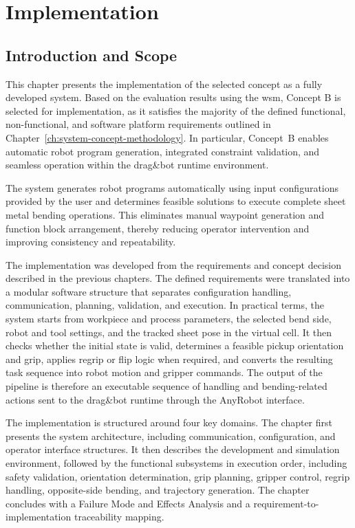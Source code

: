 \chapter{Implementation}
\label{ch:implementation}

\section{Introduction and Scope}
\label{sec:implementation-introduction-scope}

This chapter presents the implementation of the selected concept as a fully developed system. Based on the evaluation results using the \ac{wsm}, Concept B is selected for implementation, as it satisfies the majority of the defined functional, non-functional, and software platform requirements outlined in Chapter~\ref{ch:system-concept-methodology}. In particular, Concept~B enables automatic robot program generation, integrated constraint validation, and seamless operation within the drag\&bot runtime environment.

The system generates robot programs automatically using input configurations provided by the user and determines feasible solutions to execute complete sheet metal bending operations. This eliminates manual waypoint generation and function block arrangement, thereby reducing operator intervention and improving consistency and repeatability.

The implementation was developed from the requirements and concept decision described in the previous chapters. The defined requirements were translated into a modular software structure that separates configuration handling, communication, planning, validation, and execution. In practical terms, the system starts from workpiece and process parameters, the selected bend side, robot and tool settings, and the tracked sheet pose in the virtual cell. It then checks whether the initial state is valid, determines a feasible pickup orientation and grip, applies regrip or flip logic when required, and converts the resulting task sequence into robot motion and gripper commands. The output of the pipeline is therefore an executable sequence of handling and bending-related actions sent to the drag\&bot runtime through the AnyRobot interface.

The implementation is structured around four key domains. The chapter first presents the system architecture, including communication, configuration, and operator interface structures. It then describes the development and simulation environment, followed by the functional subsystems in execution order, including safety validation, orientation determination, grip planning, gripper control, regrip handling, opposite-side bending, and trajectory generation. The chapter concludes with a Failure Mode and Effects Analysis and a requirement-to-implementation traceability mapping.

